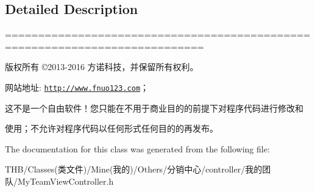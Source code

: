 \subsection{Detailed Description}
============================================================================

版权所有 ©2013-\/2016 方诺科技，并保留所有权利。

网站地址\+: \href{http://www.fnuo123.com}{\tt http\+://www.\+fnuo123.\+com}； 



这不是一个自由软件！您只能在不用于商业目的的前提下对程序代码进行修改和

使用；不允许对程序代码以任何形式任何目的的再发布。 

 

The documentation for this class was generated from the following file\+:\begin{DoxyCompactItemize}
\item 
T\+H\+B/\+Classes(类文件)/\+Mine(我的)/\+Others/分销中心/controller/我的团队/My\+Team\+View\+Controller.\+h\end{DoxyCompactItemize}
